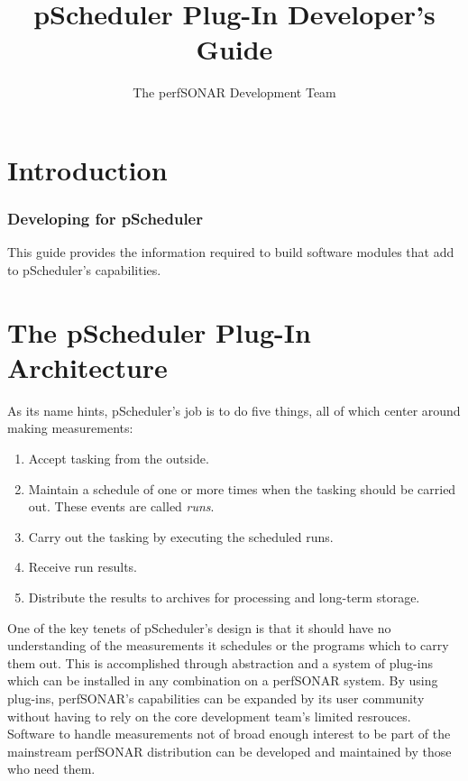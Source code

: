 \documentclass[10pt,titlepage]{article}
\title{pScheduler Plug-In Developer's Guide}
\author{The perfSONAR Development Team}
\begin{document}
\maketitle
\tableofcontents


\part{Introduction}

\section{Developing for pScheduler}

This guide provides the information required to build software modules
that add to pScheduler's capabilities.





\part{The pScheduler Plug-In Architecture}

As its name hints, pScheduler's job is to do five things, all of which
center around making measurements:

\begin{enumerate}
\item Accept tasking from the outside.
\item Maintain a schedule of one or more times when the tasking should
  be carried out.  These events are called {\it runs}.
\item Carry out the tasking by executing the scheduled runs.
\item Receive run results.
\item Distribute the results to archives for processing and long-term
  storage.
\end{enumerate}

One of the key tenets of pScheduler's design is that it should have no
understanding of the measurements it schedules or the programs which
to carry them out.  This is accomplished through abstraction and a
system of plug-ins which can be installed in any combination on a
perfSONAR system.  By using plug-ins, perfSONAR's capabilities can be
expanded by its user community without having to rely on the core
development team's limited resrouces.  Software to handle measurements
not of broad enough interest to be part of the mainstream perfSONAR
distribution can be developed and maintained by those who need them.
\end{document}
